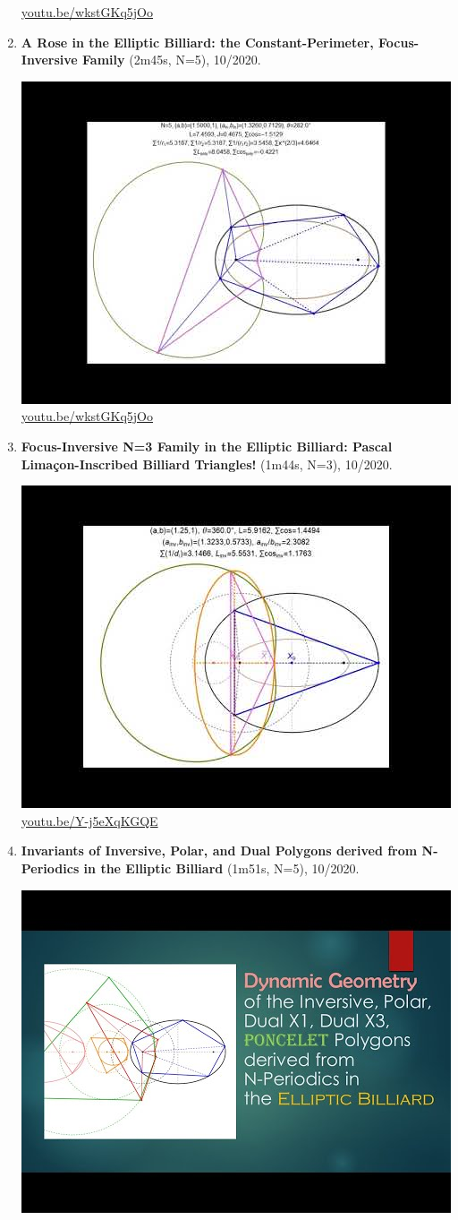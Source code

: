 \documentclass[12pt]{amsart}
\begin{document}
\begin{enumerate}[resume]
\begin{center}
\href{https://youtu.be/wkstGKq5jOo}{\url{youtu.be/wkstGKq5jOo}}\end{center}
% 
\item \textbf{A Rose in the Elliptic Billiard: the Constant-Perimeter, Focus-Inversive Family} (2m45s, N=5), 10/2020. 
\begin{center}\includegraphics[width=.5\textwidth]{pics/wkstGKq5jOo.jpg} \\ 
\href{https://youtu.be/wkstGKq5jOo}{\url{youtu.be/wkstGKq5jOo}}\end{center}
% 
\item \textbf{Focus-Inversive N=3 Family in the Elliptic Billiard: Pascal Limaçon-Inscribed Billiard Triangles!} (1m44s, N=3), 10/2020. 
\begin{center}\includegraphics[width=.5\textwidth]{pics/Y-j5eXqKGQE.jpg} \\ 
\href{https://youtu.be/Y-j5eXqKGQE}{\url{youtu.be/Y-j5eXqKGQE}}\end{center}
% 
\item \textbf{Invariants of Inversive, Polar, and Dual Polygons derived from N-Periodics in the Elliptic Billiard} (1m51s, N=5), 10/2020. 
\begin{center}\includegraphics[width=.5\textwidth]{pics/qyAHOW32NXY.jpg} \\ 

\end{center}
\end{enumerate}
\end{document}
